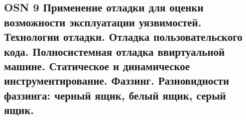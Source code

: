 \subsection{OSN 9 Применение отладки для оценки возможности эксплуатации уязвимостей. Технологии отладки. Отладка пользовательского кода. Полносистемная отладка ввиртуальной машине. Статическое и динамическое инструментирование.
Фаззинг. Разновидности фаззинга: черный ящик, белый ящик, серый ящик.}
